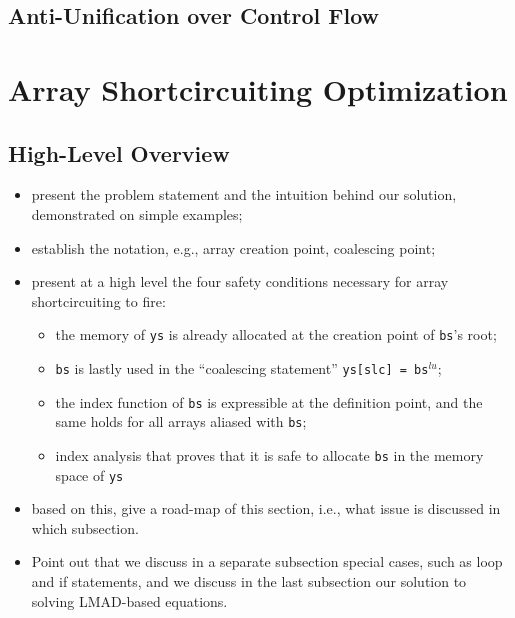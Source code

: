 \documentclass[conference]{IEEEtran}
\begin{document}
\subsection{Anti-Unification over Control Flow}
\label{subsec:lmad-gen}

\section{Array Shortcircuiting Optimization}
\label{sec:arr-shcirc}

\subsection{High-Level Overview}
\label{subsec:shcirc-hl}


\begin{itemize}
\item present the problem statement and the intuition behind our solution, demonstrated on simple examples;

\item establish the notation, e.g., array creation point, coalescing point;

\item present at a high level the four safety conditions necessary for array shortcircuiting to fire:
    \begin{itemize}
    \item the memory of {\tt ys} is already allocated at the creation point of {\tt bs}'s root;
    \item {\tt bs} is lastly used in the ``coalescing statement'' {\tt ys[slc] = bs$^{lu}$};
    \item the index function of {\tt bs} is expressible at the definition point, and the same holds for all arrays aliased with {\tt bs};
    \item index analysis that proves that it is safe to allocate {\tt bs} in the memory space of {\tt ys}
    \end{itemize}

\item based on this, give a road-map of this section, i.e., what issue is discussed in which subsection.

\item Point out that we discuss in a separate subsection special cases, such as loop and if statements, and we discuss in the last subsection our solution to solving LMAD-based equations.
\end{itemize}
\end{document}
